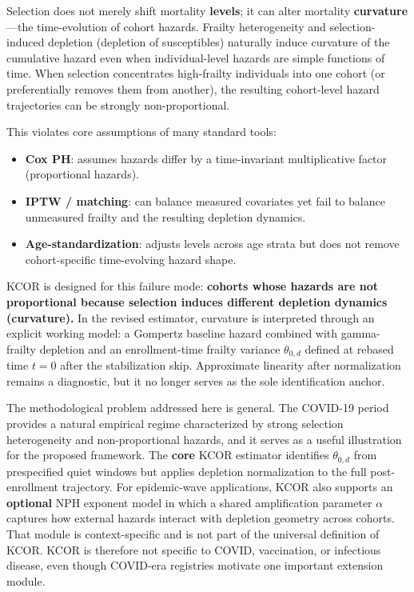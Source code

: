 \documentclass[
]{article}
\providecommand{\tightlist}{%
  \setlength{\itemsep}{0pt}\setlength{\parskip}{0pt}}
\begin{document}
Selection does not merely shift mortality \textbf{levels}; it can alter
mortality \textbf{curvature}---the time-evolution of cohort hazards.
Frailty heterogeneity and selection-induced depletion (depletion of
susceptibles) naturally induce curvature of the cumulative hazard even
when individual-level hazards are simple functions of time. When
selection concentrates high-frailty individuals into one cohort (or
preferentially removes them from another), the resulting cohort-level
hazard trajectories can be strongly non-proportional.

This violates core assumptions of many standard tools:

\begin{itemize}
\tightlist
\item
  \textbf{Cox PH}: assumes hazards differ by a time-invariant
  multiplicative factor (proportional hazards).
\item
  \textbf{IPTW / matching}: can balance measured covariates yet fail to
  balance unmeasured frailty and the resulting depletion dynamics.
\item
  \textbf{Age-standardization}: adjusts levels across age strata but
  does not remove cohort-specific time-evolving hazard shape.
\end{itemize}

KCOR is designed for this failure mode: \textbf{cohorts whose hazards
are not proportional because selection induces different depletion
dynamics (curvature).} In the revised estimator, curvature is
interpreted through an explicit working model: a Gompertz baseline
hazard combined with gamma-frailty depletion and an enrollment-time
frailty variance \(\theta_{0,d}\) defined at rebased time \(t=0\) after
the stabilization skip. Approximate linearity after normalization
remains a diagnostic, but it no longer serves as the sole identification
anchor.

The methodological problem addressed here is general. The COVID-19
period provides a natural empirical regime characterized by strong
selection heterogeneity and non-proportional hazards, and it serves as a
useful illustration for the proposed framework. The \textbf{core} KCOR
estimator identifies \(\theta_{0,d}\) from prespecified quiet windows
but applies depletion normalization to the full post-enrollment
trajectory. For epidemic-wave applications, KCOR also supports an
\textbf{optional} NPH exponent model in which a shared amplification
parameter \(\alpha\) captures how external hazards interact with
depletion geometry across cohorts. That module is context-specific and
is not part of the universal definition of KCOR. KCOR is therefore not
specific to COVID, vaccination, or infectious disease, even though
COVID-era registries motivate one important extension module.
\end{document}
